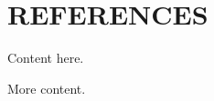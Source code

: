 \documentclass[11pt]{book}
\begin{document}
\hypertarget{references}{%
\section*{REFERENCES}\label{references}}

\Appendices


\clearpage

\label{app:first-appendix}

Content here.


\clearpage

\label{app:second-appendix}

More content.
\end{document}
